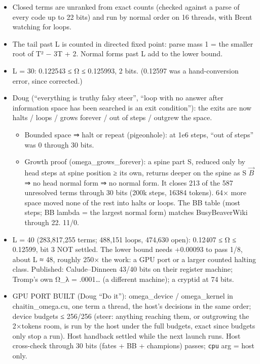 \begin{enumerate}
\begin{itemize}
\begin{itemize}
\begin{itemize}
\item Closed terms are unranked from exact counts (checked against a parse of every code up to 22 bits) and run by normal order on 16 threads, with Brent watching for loops.
\item The tail past L is counted in directed fixed point: parse mass 1 = the smaller root of T² − 3T + 2. Normal forms past L add to the lower bound.
\item L = 30: 0.122543 ≤ Ω ≤ 0.125993, 2 bits. (0.12597 was a hand-conversion error, since corrected.)
\item Doug (“everything is truthy falsy steer”, “loop with no answer after information space has been searched is an exit condition”): the exits are now halts / loops / grows forever / out of steps / outgrew the space.

\begin{itemize}
\item Bounded space ⇒ halt or repeat (pigeonhole): at 1e6 steps, “out of steps” was 0 through 30 bits.
\item Growth proof (omega\_\allowbreak{}grows\_\allowbreak{}forever): a spine part S, reduced only by head steps at spine position ≥ its own, returns deeper on the spine as S \(\vec{B}\) ⇒ no head normal form ⇒ no normal form. It closes 213 of the 587 unresolved terms through 30 bits (200k steps, 16384 tokens). 64× more space moved none of the rest into halts or loops. The BB table (most steps; BB lambda = the largest normal form) matches BusyBeaverWiki through 22. 11/0.
\end{itemize}
\item L = 40 (283,817,255 terms; 488,151 loops, 474,630 open): 0.12407 ≤ Ω ≤ 0.12599, bit 3 NOT settled. The lower bound needs +0.00093 to pass 1/8, about L ≈ 48, roughly 250× the work: a GPU port or a larger counted halting class. Published: Calude–Dinneen 43/40 bits on their register machine; Tromp's own Ω\_\allowbreak{}λ = .0001… (a different machine); a cryptid at 74 bits.
\item GPU PORT BUILT (Doug “Do it”): omega\_\allowbreak{}device / omega\_\allowbreak{}kernel in chaitin\_\allowbreak{}omega.cu, one term a thread, the host's decisions in the same order; device budgets ≤ 256/256 (steer: anything reaching them, or outgrowing the 2×tokens room, is run by the host under the full budgets, exact since budgets only stop a run). Host handback settled while the next launch runs. Host cross-check through 30 bits (fates + BB + champions) passes; \texttt{cpu} arg = host only.


\end{itemize}
\end{itemize}
\end{itemize}
\end{enumerate}
